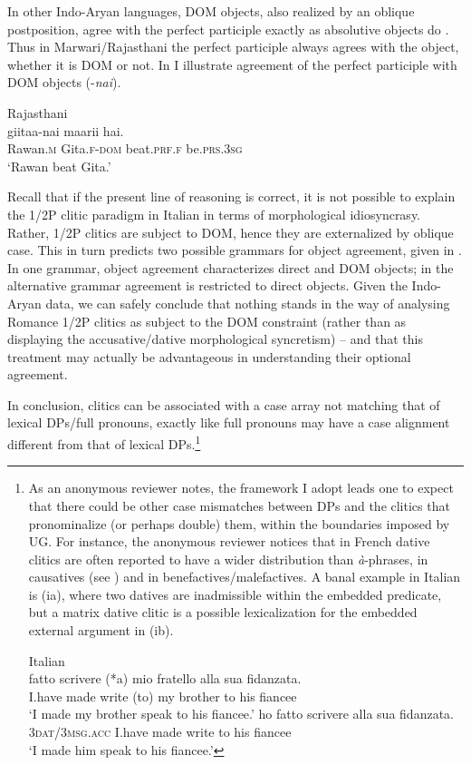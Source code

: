 \documentclass[output=paper,colorlinks,citecolor=brown,modfonts,nonflat]{langsci/langscibook}
\begin{document}
In other Indo-Aryan languages, DOM objects, also realized by an oblique postposition, agree with the perfect participle exactly as absolutive objects do \emph{\textup{\citep[342]{Masica1991}}}. Thus in Marwari/Rajasthani the perfect participle always agrees with the object, whether it is DOM or not. In  I illustrate agreement of the perfect participle with DOM objects (-\textit{nai}).

\ea%
    \label{ex:manzini:19}
    Rajasthani \citep{Khokhlova2002}\\
       {giitaa-nai}  {maarii}    {hai}.\\
        Rawan\textsc{.m}   Gita.\textsc{f-dom}   beat.\textsc{prf.f}    be.\textsc{prs.3sg}\\
    \glt ‘Rawan beat Gita.’
\z

Recall that if the present line of reasoning is correct, it is not possible to explain the 1/2P clitic paradigm in Italian in terms of morphological idiosyncrasy. Rather, 1/2P clitics are subject to DOM, hence they are externalized by oblique case. This in turn predicts two possible grammars for object agreement, given in . In one grammar, object agreement characterizes direct and DOM objects; in the alternative grammar agreement is restricted to direct objects. Given the Indo-Aryan data, we can safely conclude that nothing stands in the way of analysing Romance 1/2P clitics as subject to the DOM constraint (rather than as displaying the accusative/dative morphological syncretism) – and that this treatment may actually be advantageous in understanding their optional agreement.

\newpage
In conclusion, clitics can be associated with a case array not matching that of lexical DPs/full pronouns, exactly like full pronouns may have a case alignment different from that of lexical DPs.\footnote{As an anonymous reviewer notes, the framework I adopt leads one to expect that there could be other case mismatches between DPs and the clitics that pronominalize (or perhaps double) them, within the boundaries imposed by UG. For instance, the anonymous reviewer notices that in French dative clitics are often reported to have a wider distribution than \textit{à}-phrases, in causatives (see ) and in benefactives/malefactives. A banal example in Italian is (ia), where two datives are inadmissible within the embedded predicate, but a matrix dative clitic is a possible lexicalization for the embedded external argument in (ib).

\ea%

    Italian\\
    \ea {} {fatto} {scrivere} (*a) {mio} {fratello} {alla} {sua} {fidanzata}.\\
        {I.have} made write (to) my brother to his fiancee\\
    \glt `I made my brother speak to his fiancee.'
    \ex {} {ho} {fatto} {scrivere}   {alla} {sua} {fidanzata}.\\
        {3\textsc{dat}/\textsc{3msg.acc}} {I.have} made write   to his fiancee\\
    \glt ‘I made him speak to his fiancee.’
    \z
\z
}
\end{document}
